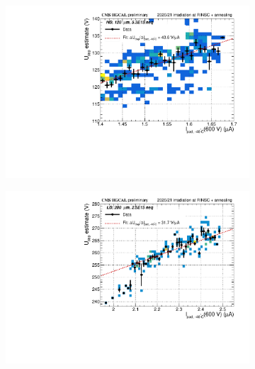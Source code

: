 \begin{figure}
	\captionsetup[subfigure]{aboveskip=-1pt,belowskip=-1pt}
	\centering
	\begin{subfigure}[b]{0.32\textwidth}
		\centering
		\includegraphics[width=0.999\textwidth]{plots/Vdep_vs_fluence/Vdep_vs_current_3009.pdf}
		\subcaption{
			}
			\label{plot:Vdep_vs_current_5414}
	\end{subfigure}
	\hfill	
	\begin{subfigure}[b]{0.32\textwidth}
		\centering
		\includegraphics[width=0.999\textwidth]{plots/Vdep_vs_fluence/Vdep_vs_current_5414.pdf}
		\subcaption{
			}
			\label{plot:Vdep_vs_current_5414}
	\end{subfigure}
	\hfill
	\begin{subfigure}[b]{0.32\textwidth}
		\centering

\end{subfigure}
\end{figure}
